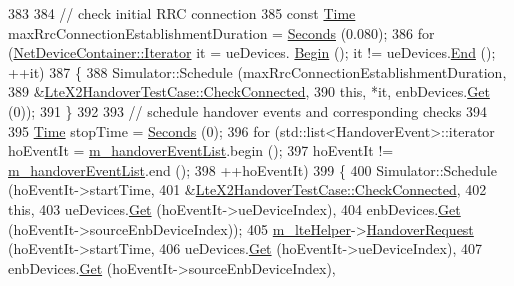 \begin{DoxyCode}
383 
384   \textcolor{comment}{// check initial RRC connection}
385   \textcolor{keyword}{const} \hyperlink{classns3_1_1Time}{Time} maxRrcConnectionEstablishmentDuration = \hyperlink{group__timecivil_ga33c34b816f8ff6628e33d5c8e9713b9e}{Seconds} (0.080);
386   \textcolor{keywordflow}{for} (\hyperlink{classns3_1_1NetDeviceContainer_a45709bb572f975569ed985fa89b132f8}{NetDeviceContainer::Iterator} it = ueDevices.
      \hyperlink{classns3_1_1NetDeviceContainer_ad5aac47677fe7277e232bdec5b48a8fc}{Begin} (); it != ueDevices.\hyperlink{classns3_1_1NetDeviceContainer_a8af596b06daf9613da60b4379861d770}{End} (); ++it)
387     \{
388       Simulator::Schedule (maxRrcConnectionEstablishmentDuration, 
389                            &\hyperlink{classLteX2HandoverTestCase_a60447eff6ec472a1637e479638cc0f83}{LteX2HandoverTestCase::CheckConnected}, 
390                            \textcolor{keyword}{this}, *it, enbDevices.\hyperlink{classns3_1_1NetDeviceContainer_a677d62594b5c9d2dea155cc5045f4d0b}{Get} (0));
391     \}
392   
393   \textcolor{comment}{// schedule handover events and corresponding checks}
394 
395   \hyperlink{classns3_1_1Time}{Time} stopTime = \hyperlink{group__timecivil_ga33c34b816f8ff6628e33d5c8e9713b9e}{Seconds} (0);  
396   \textcolor{keywordflow}{for} (std::list<HandoverEvent>::iterator hoEventIt = \hyperlink{classLteX2HandoverTestCase_ad6fb6a23499cc9ac5ac3d60dd6a66dbf}{m\_handoverEventList}.begin ();
397        hoEventIt != \hyperlink{classLteX2HandoverTestCase_ad6fb6a23499cc9ac5ac3d60dd6a66dbf}{m\_handoverEventList}.end ();
398        ++hoEventIt)
399     \{
400       Simulator::Schedule (hoEventIt->startTime, 
401                            &\hyperlink{classLteX2HandoverTestCase_a60447eff6ec472a1637e479638cc0f83}{LteX2HandoverTestCase::CheckConnected}, 
402                            \textcolor{keyword}{this}, 
403                            ueDevices.\hyperlink{classns3_1_1NetDeviceContainer_a677d62594b5c9d2dea155cc5045f4d0b}{Get} (hoEventIt->ueDeviceIndex), 
404                            enbDevices.\hyperlink{classns3_1_1NetDeviceContainer_a677d62594b5c9d2dea155cc5045f4d0b}{Get} (hoEventIt->sourceEnbDeviceIndex));
405       \hyperlink{classLteX2HandoverTestCase_afa4987b8bd9d1c3062f7705ef808be18}{m\_lteHelper}->\hyperlink{classns3_1_1LteHelper_a5b612c3b8d529e68b848cdca95838087}{HandoverRequest} (hoEventIt->startTime, 
406                                     ueDevices.\hyperlink{classns3_1_1NetDeviceContainer_a677d62594b5c9d2dea155cc5045f4d0b}{Get} (hoEventIt->ueDeviceIndex),
407                                     enbDevices.\hyperlink{classns3_1_1NetDeviceContainer_a677d62594b5c9d2dea155cc5045f4d0b}{Get} (hoEventIt->sourceEnbDeviceIndex),

\end{DoxyCode}
